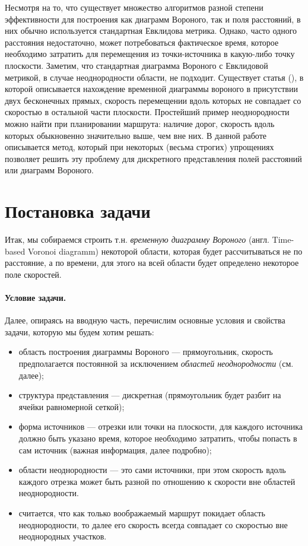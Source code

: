 \documentclass[12pt]{article}
\begin{document}
Несмотря на то, что существует множество алгоритмов разной степени 
эффективности для построения как диаграмм Вороного, так и поля расстояний,
в них обычно используется стандартная Евклидова метрика. Однако, часто одного
расстояния недостаточно, может потребоваться фактическое время, которое 
необходимо затратить для перемещения из точки-источника в какую-либо точку
плоскости. Заметим, что стандартная диаграмма Вороного с Евклидовой метрикой,
в случае неоднородности области, не подходит.
Существует статья (\cite{timeb}), в которой описывается нахождение временной 
диаграммы вороного в присутствии двух бесконечных прямых, скорость перемещении
вдоль которых не совпадает со скоростью в остальной части плоскости. 
Простейший пример неоднородности можно найти при планировании маршрута: 
наличие дорог, скорость вдоль которых обыкновенно значительно выше, чем вне
них. В данной работе описывается метод, который при некоторых (весьма строгих)
упрощениях позволяет решить эту проблему для дискретного представления полей
 расстояний или диаграмм Вороного.

\section{Постановка задачи}
\label{task}
Итак, мы собираемся строить т.н. \emph{временную диаграмму Вороного} 
(англ. Time-based Voronoi diagramm) некоторой области, которая будет 
рассчитываться не по расстояние, а по времени, для этого на всей области
 будет определено некоторое поле скоростей. 

\paragraph{Условие задачи.} Далее, опираясь на вводную часть, перечислим 
основные условия и свойства задачи, которую мы будем хотим решать:
\begin{itemize}
\label{props}
\item область построения диаграммы Вороного --- прямоугольник, скорость 
предполагается постоянной за исключением \emph{областей неоднородности} (см. далее);
\item структура представления --- дискретная (прямоугольник будет разбит на 
ячейки равномерной сеткой);
\item форма источников --- отрезки или точки на плоскости, для каждого 
источника должно быть указано время, которое необходимо затратить, чтобы 
попасть в сам источник (важная информация, далее подробно);
\item области неоднородности --- это сами источники, при этом скорость вдоль
каждого отрезка может быть разной по отношению к скорости вне областей 
неоднородности.
\item считается, что как только воображаемый маршрут покидает область 
неоднородности, то далее его скорость всегда совпадает со скоростью вне 
неоднородных участков.
\end{itemize}
\end{document}
